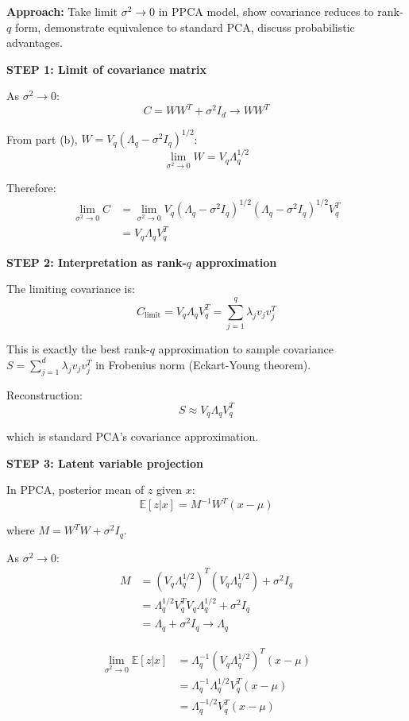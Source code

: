 \documentclass[12pt]{article}
\begin{document}
\begin{solution}

\textbf{Approach:} Take limit $\sigma^2 \to 0$ in PPCA model, show covariance reduces to rank-$q$ form, demonstrate equivalence to standard PCA, discuss probabilistic advantages.

\textbf{STEP 1: Limit of covariance matrix}

As $\sigma^2 \to 0$:
\[
C = WW^T + \sigma^2 I_d \to WW^T
\]

From part (b), $W = V_q(\Lambda_q - \sigma^2 I_q)^{1/2}$:
\[
\lim_{\sigma^2 \to 0} W = V_q \Lambda_q^{1/2}
\]

Therefore:
\begin{align*}
\lim_{\sigma^2 \to 0} C &= \lim_{\sigma^2 \to 0} V_q(\Lambda_q - \sigma^2 I_q)^{1/2}(\Lambda_q - \sigma^2 I_q)^{1/2}V_q^T \\
&= V_q \Lambda_q V_q^T
\end{align*}

\textbf{STEP 2: Interpretation as rank-$q$ approximation}

The limiting covariance is:
\[
C_{\text{limit}} = V_q \Lambda_q V_q^T = \sum_{j=1}^q \lambda_j v_j v_j^T
\]

This is exactly the best rank-$q$ approximation to sample covariance $S = \sum_{j=1}^d \lambda_j v_j v_j^T$ in Frobenius norm (Eckart-Young theorem).

Reconstruction:
\[
S \approx V_q \Lambda_q V_q^T
\]

which is standard PCA's covariance approximation.

\textbf{STEP 3: Latent variable projection}

In PPCA, posterior mean of $z$ given $x$:
\[
\mathbb{E}[z|x] = M^{-1}W^T(x - \mu)
\]

where $M = W^TW + \sigma^2 I_q$.

As $\sigma^2 \to 0$:
\begin{align*}
M &= (V_q\Lambda_q^{1/2})^T(V_q\Lambda_q^{1/2}) + \sigma^2 I_q \\
&= \Lambda_q^{1/2}V_q^TV_q\Lambda_q^{1/2} + \sigma^2 I_q \\
&= \Lambda_q + \sigma^2 I_q \to \Lambda_q
\end{align*}

\begin{align*}
\lim_{\sigma^2 \to 0}\mathbb{E}[z|x] &= \Lambda_q^{-1}(V_q\Lambda_q^{1/2})^T(x - \mu) \\
&= \Lambda_q^{-1}\Lambda_q^{1/2}V_q^T(x - \mu) \\
&= \Lambda_q^{-1/2}V_q^T(x - \mu)
\end{align*}


\end{solution}
\end{document}
